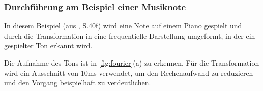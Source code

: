 







\par

\subsubsection{Durchführung am Beispiel einer Musiknote}

In diesem Beispiel (aus \cite{fundamentals_of_music_processing}, S.40f) wird eine Note auf einem Piano gespielt und durch die Transformation in eine frequentielle Darstellung umgeformt, in der ein gespielter Ton erkannt wird.

\par


Die Aufnahme des Tons ist in \cref{fig:fourier}(a) zu erkennen. Für die Transformation wird ein Ausschnitt von 10ms verwendet, um den Rechenaufwand zu reduzieren und den Vorgang beispielhaft zu verdeutlichen.

